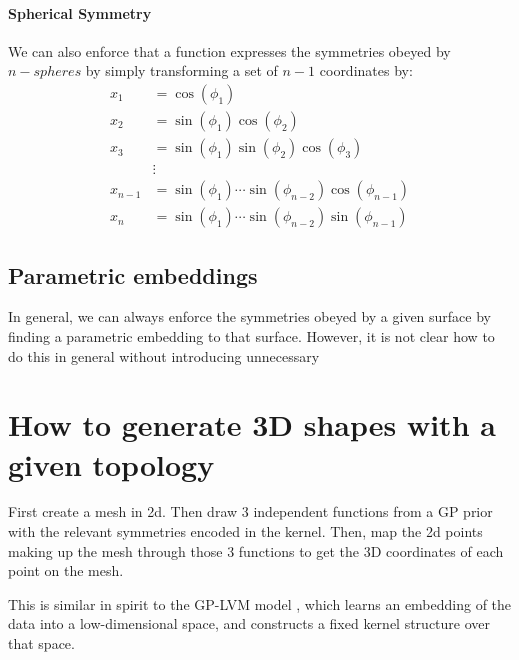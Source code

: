 \paragraph{Spherical Symmetry}

We can also enforce that a function expresses the symmetries obeyed by $n-spheres$ by simply transforming a set of $n - 1$ coordinates by:
%
\begin{align}
x_1 & = \cos(\phi_1) \nonumber \\
x_2 & = \sin(\phi_1) \cos(\phi_2) \nonumber \\
x_3 & = \sin(\phi_1) \sin(\phi_2) \cos(\phi_3) \nonumber \\
& \vdots \nonumber \\
x_{n-1} & = \sin(\phi_1) \cdots \sin(\phi_{n-2}) \cos(\phi_{n-1}) \nonumber \\
x_n & = \sin(\phi_1) \cdots \sin(\phi_{n-2}) \sin(\phi_{n-1})
\end{align}

\cite{flanders1989}

\subsection{Parametric embeddings}

In general, we can always enforce the symmetries obeyed by a given surface by finding a parametric embedding to that surface.  However, it is not clear how to do this in general without introducing unnecessary 








\section{How to generate 3D shapes with a given topology}

First create a mesh in 2d.  Then draw 3 independent functions from a GP prior with the relevant symmetries encoded in the kernel.  Then, map the 2d points making up the mesh through those 3 functions to get the 3D  coordinates of each point on the mesh.

This is similar in spirit to the GP-LVM model \cite{lawrence2005probabilistic}, which learns an embedding of the data into a low-dimensional space, and constructs a fixed kernel structure over that space.

